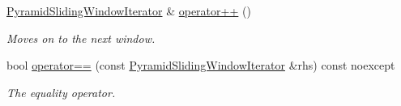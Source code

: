 \begin{DoxyCompactItemize}
\hyperlink{classdg_1_1deepcore_1_1imagery_1_1_pyramid_sliding_window_iterator}{Pyramid\+Sliding\+Window\+Iterator} \& \hyperlink{group___imagery_module_gaa6990163252dcca167db1dde03c55100}{operator++} ()
\begin{DoxyCompactList}\small\item\em Moves on to the next window. \end{DoxyCompactList}\item 
bool \hyperlink{group___imagery_module_gaa1566b49b13ee8b98e58d748aba156b3}{operator==} (const \hyperlink{classdg_1_1deepcore_1_1imagery_1_1_pyramid_sliding_window_iterator}{Pyramid\+Sliding\+Window\+Iterator} \&rhs) const noexcept
\begin{DoxyCompactList}\small\item\em The equality operator. \end{DoxyCompactList}\end{DoxyCompactItemize}
